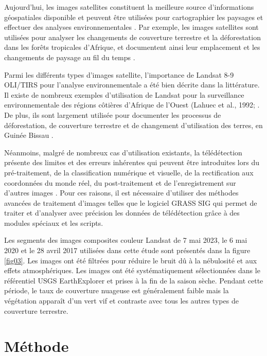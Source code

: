 \documentclass{rfpt}
\begin{document}
Aujourd’hui, les images satellites constituent la meilleure source d’informations géospatiales disponible et peuvent être utilisées pour cartographier les paysages et effectuer des analyses environnementales \cite{MASOLELE2021112600,Lemenkova202229,TANG2023113626,Lemenkova2022}. Par exemple, les images satellites sont utilisées pour analyser les changements de couverture terrestre et la déforestation dans les forêts tropicales d’Afrique, et documentent ainsi leur emplacement et les changements de paysage au fil du temps \cite{Kilian,Lemenkova202310,jmse11040871,Tsayem}. 

Parmi les différents types d'images satellite, l'importance de Landsat 8-9 OLI/TIRS pour l'analyse environnementale a été bien décrite dans la littérature. Il existe de nombreux exemples d'utilisation de Landsat pour la surveillance environnementale des régions côtières d'Afrique de l'Ouest (Lahuec et al., 1992; \cite{Rifai,Lemenkova202227,Lemenkova202322}. De plus, ils sont largement utilisée pour documenter les processus de déforestation, de couverture terrestre et de changement d'utilisation des terres, en Guinée Bissau \cite{TemudoCabral,Cuq}.

Néanmoins, malgré de nombreux cas d'utilisation existants, la télédétection présente des limites et des erreurs inhérentes qui peuvent être introduites lors du pré-traitement, de la classification numérique et visuelle, de la rectification aux coordonnées du monde réel, du post-traitement et de l'enregistrement sur d'autres images \cite{Desjardins,Girou}. Pour ces raisons, il est nécessaire d'utiliser des méthodes avancées de traitement d'images telles que le logiciel GRASS SIG qui permet de traiter et d'analyser avec précision les données de télédétection grâce à des modules spéciaux et les scripts.

Les segments des images composites couleur Landsat de 7 mai 2023, le 6 mai 2020 et le 28 avril 2017 utilisées dans cette étude sont présentés dans la figure \ref{fig03}. Les images ont été filtrées pour réduire le bruit dû à la nébulosité et aux effets atmosphériques. Les images ont été systématiquement sélectionnées dans le référentiel USGS EarthExplorer et prises à la fin de la saison sèche. Pendant cette période, le taux de couverture nuageuse est généralement faible mais la végétation apparaît d'un vert vif et contraste avec tous les autres types de couverture terrestre.

\section{Méthode}
\end{document}
